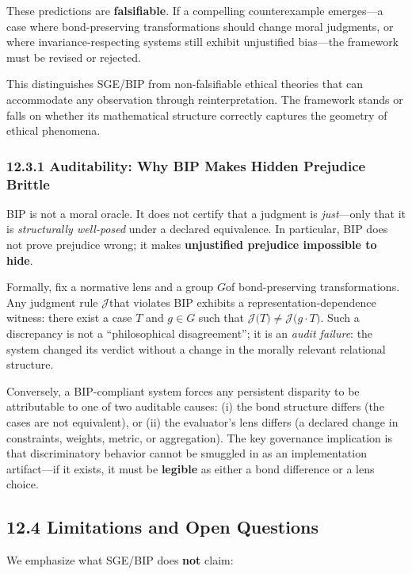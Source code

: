 \documentclass[12pt]{article}
\theoremstyle{plain}
\theoremstyle{definition}
\theoremstyle{remark}
\begin{document}
These predictions are \textbf{falsifiable}. If a compelling
counterexample emerges---a case where bond-preserving transformations
should change moral judgments, or where invariance-respecting systems
still exhibit unjustified bias---the framework must be revised or
rejected.

This distinguishes SGE/BIP from non-falsifiable ethical theories that
can accommodate any observation through reinterpretation. The framework
stands or falls on whether its mathematical structure correctly captures
the geometry of ethical phenomena.

\subsubsection{12.3.1 Auditability: Why BIP Makes Hidden Prejudice
Brittle}\label{auditability-why-bip-makes-hidden-prejudice-brittle}

BIP is not a moral oracle. It does not certify that a judgment is
\emph{just}---only that it is \emph{structurally well-posed} under a
declared equivalence. In particular, BIP does not prove prejudice wrong;
it makes \textbf{unjustified prejudice impossible to hide}.

Formally, fix a normative lens and a group \(G\)of bond-preserving
transformations. Any judgment rule \(\mathcal{J}\)that violates BIP
exhibits a representation-dependence witness: there exist a case \(T\)
and \(g \in G\) such that
\(\mathcal{J(}T) \neq \mathcal{J(}g \cdot T)\). Such a discrepancy is
not a ``philosophical disagreement''; it is an \emph{audit failure}: the
system changed its verdict without a change in the morally relevant
relational structure.

Conversely, a BIP-compliant system forces any persistent disparity to be
attributable to one of two auditable causes: (i) the bond structure
differs (the cases are not equivalent), or (ii) the evaluator's lens
differs (a declared change in constraints, weights, metric, or
aggregation). The key governance implication is that discriminatory
behavior cannot be smuggled in as an implementation artifact---if it
exists, it must be \textbf{legible} as either a bond difference or a
lens choice.

\subsection{12.4 Limitations and Open
Questions}\label{limitations-and-open-questions-1}

We emphasize what SGE/BIP does \textbf{not} claim:
\end{document}
